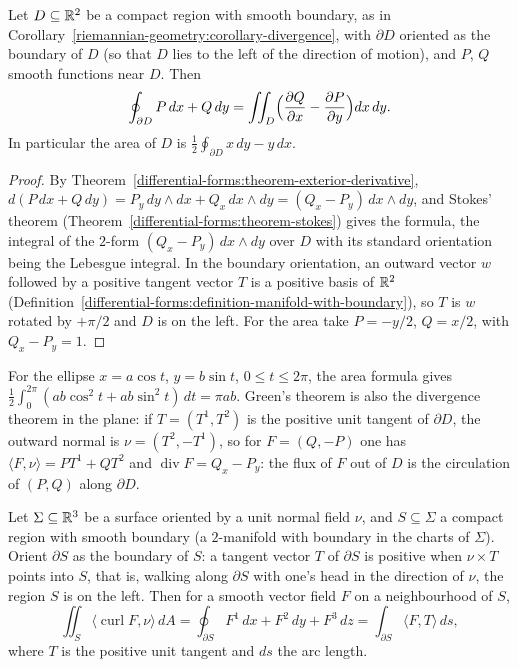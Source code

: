 \begin{corollary}\label{riemannian-geometry:corollary-green-theorem}
Let $D \subseteq \mathbb{R}^2$ be a compact region with smooth boundary, as in Corollary~\ref{riemannian-geometry:corollary-divergence}, with $\partial D$ oriented as the boundary of $D$ (so that $D$ lies to the left
of the direction of motion), and $P$, $Q$ smooth functions near $D$. Then
\[
\oint_{\partial D}P\,dx + Q\,dy = \iint_D\Bigl(\frac{\partial Q}{\partial x} - \frac{\partial P}{\partial y}\Bigr)dx\,dy .
\]
In particular the area of $D$ is $\frac12\oint_{\partial D}x\,dy - y\,dx$.
\end{corollary}

\begin{proof}
By Theorem~\ref{differential-forms:theorem-exterior-derivative}, $d(P\,dx + Q\,dy) = P_y\,dy \wedge dx + Q_x\,dx \wedge dy = (Q_x - P_y)\,dx \wedge dy$, and Stokes' theorem
(Theorem~\ref{differential-forms:theorem-stokes}) gives the formula, the integral of the $2$-form $(Q_x - P_y)\,dx \wedge dy$ over $D$ with its standard orientation being the Lebesgue integral. In the boundary
orientation, an outward vector $w$ followed by a positive tangent vector $T$ is a positive basis of $\mathbb{R}^2$ (Definition~\ref{differential-forms:definition-manifold-with-boundary}), so $T$ is $w$ rotated by $+\pi/2$
and $D$ is on the left. For the area take $P = -y/2$, $Q = x/2$, with $Q_x - P_y = 1$.
\end{proof}

For the ellipse $x = a\cos t$, $y = b\sin t$, $0 \leq t \leq 2\pi$, the area formula gives $\frac12\int_0^{2\pi}(ab\cos^2t + ab\sin^2t)\,dt = \pi ab$. Green's theorem is also the divergence theorem in the plane:
if $T = (T^1, T^2)$ is the positive unit tangent of $\partial D$, the outward normal is $\nu = (T^2, -T^1)$, so for $F = (Q, -P)$ one has $\langle F, \nu\rangle = PT^1 + QT^2$ and $\operatorname{div}F = Q_x - P_y$: the flux of
$F$ out of $D$ is the circulation of $(P, Q)$ along $\partial D$.

\begin{corollary}\label{riemannian-geometry:corollary-kelvin-stokes}
Let $\Sigma \subseteq \mathbb{R}^3$ be a surface oriented by a unit normal field $\nu$, and $S \subseteq \Sigma$ a compact region with smooth boundary (a $2$-manifold with boundary in the charts of $\Sigma$). Orient
$\partial S$ as the boundary of $S$: a tangent vector $T$ of $\partial S$ is positive when $\nu \times T$ points into $S$, that is, walking along $\partial S$ with one's head in the direction of $\nu$, the
region $S$ is on the left. Then for a smooth vector field $F$ on a neighbourhood of $S$,
\[
\iint_S\langle\operatorname{curl}F, \nu\rangle\,dA = \oint_{\partial S}F^1\,dx + F^2\,dy + F^3\,dz = \int_{\partial S}\langle F, T\rangle\,ds,
\]
where $T$ is the positive unit tangent and $ds$ the arc length.
\end{corollary}

